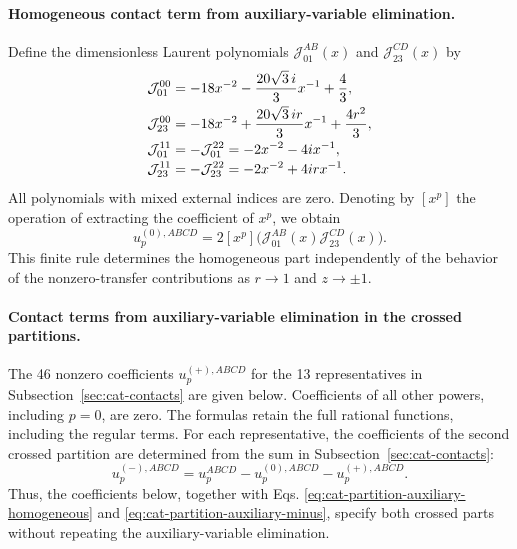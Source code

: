 \documentclass[11pt,a4paper]{article}
\begin{document}
\paragraph{Homogeneous contact term from auxiliary-variable elimination.}
Define the dimensionless Laurent polynomials $\mathcal J_{01}^{AB}(x)$ and $\mathcal J_{23}^{CD}(x)$ by
\begin{equation}
\shortstack[l]{$\displaystyle \mathcal J_{01}^{00}=-18x^{-2}-\frac{20\sqrt3\,i}{3}x^{-1}+\frac43,$\\
$\displaystyle \mathcal J_{23}^{00}=-18x^{-2}+\frac{20\sqrt3\,ir}{3}x^{-1}+\frac{4r^2}{3},$\\
$\displaystyle \mathcal J_{01}^{11}=-\mathcal J_{01}^{22}=-2x^{-2}-4ix^{-1},$\\
$\displaystyle \mathcal J_{23}^{11}=-\mathcal J_{23}^{22}=-2x^{-2}+4irx^{-1}.$}
\label{eq:cat-partition-homogeneous-polynomials}
\end{equation}
All polynomials with mixed external indices are zero. Denoting by $[x^p]$ the operation of extracting the coefficient of $x^p$, we obtain
\begin{equation}
 u_p^{(0),ABCD}=2[x^p]\bigl(\mathcal J_{01}^{AB}(x)\mathcal J_{23}^{CD}(x)\bigr).
\label{eq:cat-partition-auxiliary-homogeneous}
\end{equation}
This finite rule determines the homogeneous part independently of the behavior of the nonzero-transfer contributions as $r\to1$ and $z\to\pm1$.

\paragraph{Contact terms from auxiliary-variable elimination in the crossed partitions.}
The 46 nonzero coefficients $u_p^{(+),ABCD}$ for the 13 representatives in Subsection~\ref{sec:cat-contacts} are given below. Coefficients of all other powers, including $p=0$, are zero. The formulas retain the full rational functions, including the regular terms. For each representative, the coefficients of the second crossed partition are determined from the sum in Subsection~\ref{sec:cat-contacts}:
\begin{equation}
 u_p^{(-),ABCD}=u_p^{ABCD}-u_p^{(0),ABCD}-u_p^{(+),ABCD}.
\label{eq:cat-partition-auxiliary-minus}
\end{equation}
Thus, the coefficients below, together with Eqs. \eqref{eq:cat-partition-auxiliary-homogeneous} and \eqref{eq:cat-partition-auxiliary-minus}, specify both crossed parts without repeating the auxiliary-variable elimination.
\end{document}
